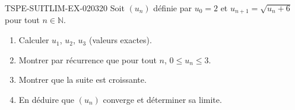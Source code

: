 \begin{exercice}{TSPE-SUITLIM-EX-020}{3}{20}
Soit $(u_n)$ définie par $u_0 = 2$ et $u_{n+1} = \sqrt{u_n + 6}$ pour tout $n \in \mathbb{N}$.
\begin{enumerate}
  \item Calculer $u_1$, $u_2$, $u_3$ (valeurs exactes).
  \item Montrer par récurrence que pour tout $n$, $0 \leq u_n \leq 3$.
  \item Montrer que la suite est croissante.
  \item En déduire que $(u_n)$ converge et déterminer sa limite.
\end{enumerate}
\end{exercice}
